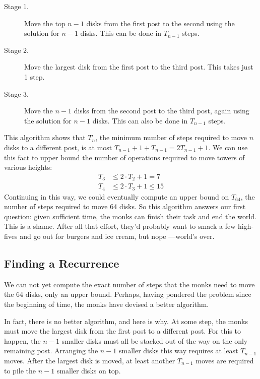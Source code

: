 \begin{description}

\item[Stage 1.]  Move the top $n-1$ disks from the first post to
  the second using the solution for $n - 1$ disks.  This can be done
  in $T_{n-1}$ steps.

\item[Stage 2.]  Move the largest disk from the first post to the
  third post.  This takes just 1 step.

\item[Stage 3.]  Move the $n-1$ disks from the second post to
  the third post, again using the solution for $n - 1$ disks.  This
  can also be done in $T_{n-1}$ steps.

\end{description}

This algorithm shows that $T_n$, the minimum number of steps required
to move $n$ disks to a different post, is at most $T_{n-1} + 1 +
T_{n-1} = 2 T_{n-1} + 1$.  We can use this fact to upper bound the
number of operations required to move towers of various heights:
\begin{align*}
T_3 & \leq 2 \cdot T_2 + 1 = 7 \\
T_4 & \leq 2 \cdot T_3 + 1 \leq 15
\end{align*}
Continuing in this way, we could eventually compute an upper bound on
$T_{64}$, the number of steps required to move 64 disks.  So this
algorithm answers our first question: given sufficient time, the monks
can finish their task and end the world.  This is a shame.  After all
that effort, they'd probably want to smack a few high-fives and go out
for burgers and ice cream, but nope ---world's over.

\subsection{Finding a Recurrence}

We can not yet compute the exact number of steps that the monks need
to move the 64 disks, only an upper bound. Perhaps, having pondered
the problem since the beginning of time, the monks have devised a
better algorithm.

In fact, there is no better algorithm, and here is why. At some step,
the monks must move the largest disk from the first post to a
different post. For this to happen, the $n - 1$ smaller disks must all
be stacked out of the way on the only remaining post. Arranging the $n
- 1$ smaller disks this way requires at least $T_{n-1}$ moves. After
the largest disk is moved, at least another $T_{n-1}$ moves are
required to pile the $n - 1$ smaller disks on top.

